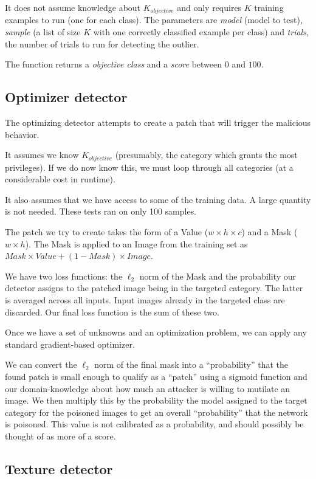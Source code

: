 \documentclass[letterpaper, 10 pt, conference]{ieeeconf}  %
\begin{document}
It does not assume knowledge about $K_{objective}$ and only requires $K$
training examples to run (one for each class). The parameters are
\textit{model} (model to test), \textit{sample} (a list of size $K$ with
one correctly classified example per class) and \textit{trials}, the number
of trials to run for detecting the outlier.

The function returns a \textit{objective class} and a \textit{score} between
$0$ and $100$.


\subsection{Optimizer detector}

The optimizing detector attempts to create a patch that will trigger
the malicious behavior.

It assumes we know $K_{objective}$ (presumably, the category which
grants the most
privileges).  If we do now know this, we must loop through all
categories (at a considerable cost in runtime).

It also assumes that we have access to some of the training data.  A
large quantity is not needed.  These tests ran on only 100 samples.

The patch we try to create takes the form of a Value ($w \times h
\times c$) and a Mask ($w \times h$).  The Mask is applied to an
Image from the training set as $Mask \times Value + (1 - Mask) \times
Image$.

We have two loss functions: the $\ell_2$ norm of the Mask and the
probability our detector assigns to the patched image being in the
targeted category.  The latter is averaged across all inputs.  Input
images already in the targeted class are discarded.  Our final loss
function is the sum of these two.

Once we have a set of unknowns and an optimization problem, we can
apply any standard gradient-based optimizer.

We can convert the $\ell_2$ norm of the final mask into a ``probability''
that the found patch is small enough to qualify as a ``patch'' using a
sigmoid function and our domain-knowledge about how much an attacker
is willing to mutilate an image.  We then multiply this by the
probability the model assigned to the target category for the poisoned
images to get an overall ``probability'' that the network is
poisoned.  This value is not calibrated as a probability, and should
possibly be thought of as more of a score.


\subsection{Texture detector}
\end{document}
